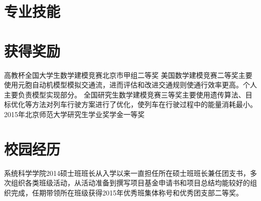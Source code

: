 \documentclass[11pt,a4paper]{moderncv}
\begin{document}
\section{专业技能}

\section{获得奖励} %
{高教杯全国大学生数学建模竞赛北京市甲组二等奖}{}{}{}{}
{美国数学建模竞赛二等奖}{}{}{}{主要使用元胞自动机模型模拟交通流，进而评估和改进交通规则使通行效率更高。个人主要负责模型实现部分。}
{全国研究生数学建模竞赛三等奖}{}{}{}{主要使用遗传算法、目标优化等方法对列车行驶方案进行了优化，使列车在行驶过程中的能量消耗最小。}
{2015年北京师范大学研究生学业奖学金一等奖}{}{}{}{}

\section{校园经历} %
{系统科学学院2014硕士班班长}{}{}{}{从入学以来一直担任所在硕士班班长兼任团支书，多次组织各类班级活动，从活动准备到撰写项目基金申请书和项目总结均能较好的组织完成，任期带领所在班级获得2015年优秀班集体称号和优秀团支部二等奖。}

\closesection{}                   %
\renewcommand{\listitemsymbol}{-} %
\end{document}
